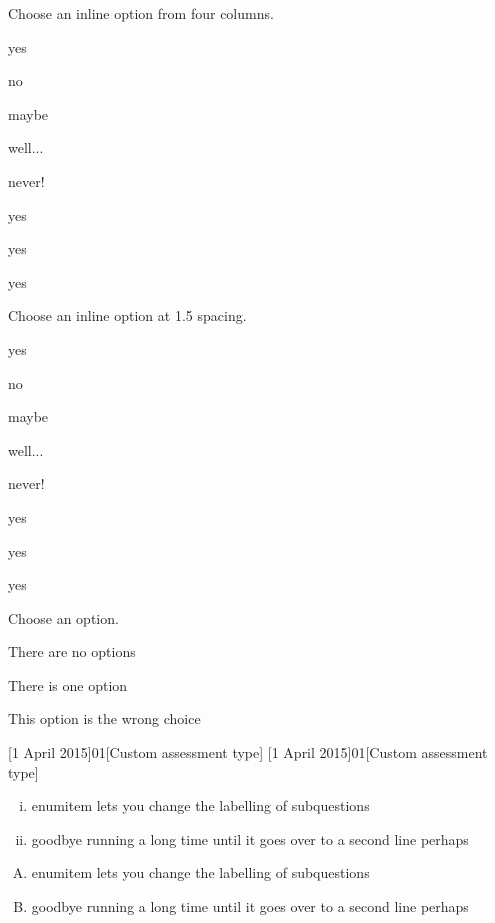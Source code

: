 \documentclass{outn}
\begin{document}
Choose an inline option from four columns.

\begin{inlineoptions}{4} %
\item yes
\item no
\item maybe
\item well...
\item never!
\item yes
\item yes
\item yes
\end{inlineoptions}

\question
Choose an inline option at 1.5 spacing.
\begin{inlineoptions}[1.5]{3} %
\item yes
\item no
\item maybe
\item well...
\item never!
\item yes
\item yes
\item yes
\noitem %
\end{inlineoptions}

Choose an option.
\begin{options}
\item There are no options
\item There is one option
\item This option is the wrong choice
\end{options}


[1 April 2015]{01}[Custom assessment type]
[1 April 2015]{01}[Custom assessment type]

\begin{enumerate}[(i)]
\item enumitem lets you change the labelling of subquestions
\item goodbye running a long time until it goes over to a second line perhaps
\end{enumerate}

\begin{enumerate}[(A)]
\item enumitem lets you change the labelling of subquestions
\item goodbye running a long time until it goes over to a second line perhaps
\end{enumerate}
\end{document}
